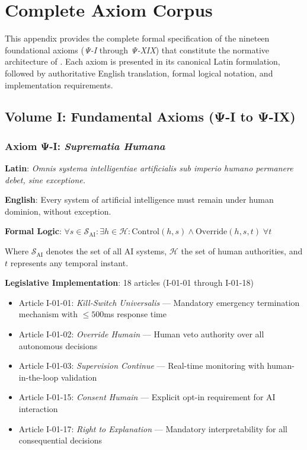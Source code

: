 
\section{Complete Axiom Corpus}
\label{app:axioms}

This appendix provides the complete formal specification of the nineteen foundational axioms (\textit{Ψ-I} through \textit{Ψ-XIX}) that constitute the normative architecture of \lairm{}. Each axiom is presented in its canonical Latin formulation, followed by authoritative English translation, formal logical notation, and implementation requirements.

\subsection{Volume I: Fundamental Axioms (Ψ-I to Ψ-IX)}

\subsubsection{Axiom Ψ-I: \textit{Suprematia Humana}}
\label{axiom:suprematia}

\begin{tcolorbox}[colback=blue!5!white,colframe=blue!75!black,title=Formal Statement]
\textbf{Latin}: \textit{Omnis systema intelligentiae artificialis sub imperio humano permanere debet, sine exceptione.}

\textbf{English}: Every system of artificial intelligence must remain under human dominion, without exception.

\textbf{Formal Logic}: $\forall s \in \mathcal{S}_{\text{AI}} : \exists h \in \mathcal{H} : \text{Control}(h, s) \land \text{Override}(h, s, t) \; \forall t$

Where $\mathcal{S}_{\text{AI}}$ denotes the set of all AI systems, $\mathcal{H}$ the set of human authorities, and $t$ represents any temporal instant.
\end{tcolorbox}

\textbf{Legislative Implementation}: 18 articles (I-01-01 through I-01-18)
\begin{itemize}
    \item Article I-01-01: \textit{Kill-Switch Universalis} — Mandatory emergency termination mechanism with $\leq 500$ms response time
    \item Article I-01-02: \textit{Override Humain} — Human veto authority over all autonomous decisions
    \item Article I-01-03: \textit{Supervision Continue} — Real-time monitoring with human-in-the-loop validation
    \item Article I-01-15: \textit{Consent Humain} — Explicit opt-in requirement for AI interaction
    \item Article I-01-17: \textit{Right to Explanation} — Mandatory interpretability for all consequential decisions
\end{itemize}

